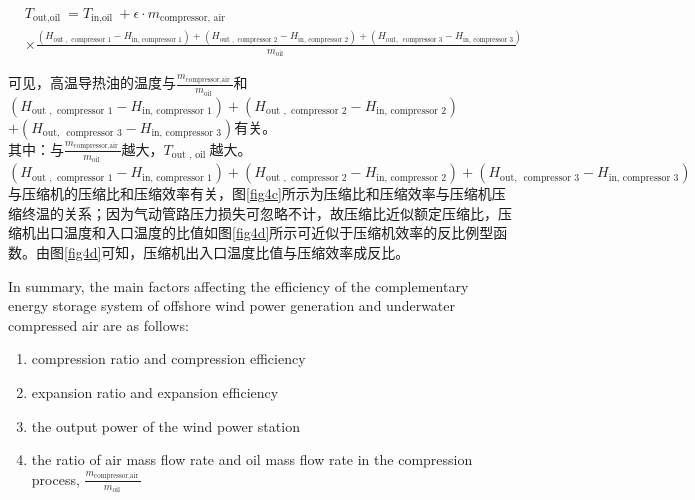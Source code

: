 \documentclass[journal,onecolumn]{IEEEtran}
\begin{document}
\begin{equation}\label{f35}
	\begin{aligned}
		&T_{\text {out,oil }}=T_{\text {in,oil }}+\epsilon \cdot m_{\text {compressor, air }}\\
		&\times \frac{\left(H_{\text {out }, \text { compressor } 1}-H_{\text {in, compressor } 1}\right)+\left(H_{\text {out }, \text { compressor } 2}-H_{\text {in, compressor } 2}\right)+\left(H_{\text {out, } \text { compressor } 3}-H_{\text {in, compressor } 3}\right)}{m_{\text {oil }}}
	\end{aligned}
\end{equation}

可见，高温导热油的温度与$ \frac{m_{\text {compressor,air }}}{m_{\text {oil }}} $和$\left(H_{\text {out }, \text { compressor } 1}-H_{\text {in, compressor } 1}\right)+\left(H_{\text {out }, \text { compressor } 2}-H_{\text {in, compressor } 2}\right)$\\

$+\left(H_{\text {out, } \text { compressor } 3}-H_{\text {in, compressor } 3}\right)  $有关。\\

其中：与$ \frac{m_{\text {compressor,air }}}{m_{\text {oil }}} $越大，$ T_{\text {out }, \text { oil }} $越大。\\

$\left(H_{\text {out }, \text { compressor } 1}-H_{\text {in, compressor } 1}\right)+\left(H_{\text {out }, \text { compressor } 2}-H_{\text {in, compressor } 2}\right)+\left(H_{\text {out, } \text { compressor } 3}-H_{\text {in, compressor } 3}\right)  $与压缩机的压缩比和压缩效率有关，图\ref{fig4c}所示为压缩比和压缩效率与压缩机压缩终温的关系；因为气动管路压力损失可忽略不计，故压缩比近似额定压缩比，压缩机出口温度和入口温度的比值如图\ref{fig4d}所示可近似于压缩机效率的反比例型函数。由图\ref{fig4d}可知，压缩机出入口温度比值与压缩效率成反比。

In summary, the main factors affecting the efficiency of the complementary energy storage system of offshore wind power generation and underwater compressed air are as follows:
\begin{enumerate}
	\item compression ratio and compression efficiency
	\item expansion ratio and expansion efficiency
	\item the output power of the wind power station
	\item the ratio of air mass flow rate and oil mass flow rate in the compression process, $ \frac{m_{\text {compressor,air }}}{m_{\text {oil }}} $
\end{enumerate}
\end{document}
